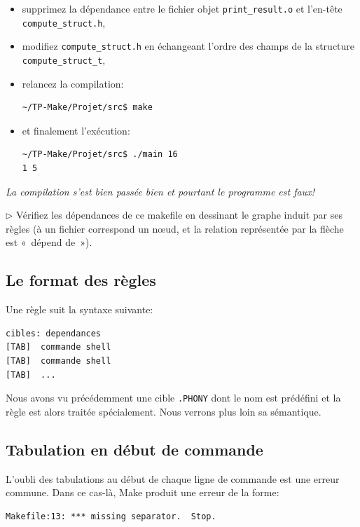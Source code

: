 \documentclass[11pt,a4paper]{article}
\newcommand{\must}{\noindent $\triangleright$ \xspace}
\begin{document}
\begin{itemize}

  \item[$\triangleright$] supprimez la dépendance entre le fichier
  objet \verb!print_result.o!  et l'en-tête \verb!compute_struct.h!,

  \item[$\triangleright$] modifiez \verb!compute_struct.h! en
  échangeant l'ordre des champs de la structure \verb!compute_struct_t!,

  \item[$\triangleright$] relancez la compilation:
{\small
\begin{verbatim}
~/TP-Make/Projet/src$ make
\end{verbatim}
}
   \item[$\triangleright$] et finalement l'exécution:
{\small
\begin{verbatim}
~/TP-Make/Projet/src$ ./main 16
1 5
\end{verbatim}
}

\end{itemize}

\noindent \emph{La compilation s'est bien passée bien et pourtant le
programme est faux!}

\medskip

\must Vérifiez les dépendances de ce makefile en dessinant le
graphe induit par ses règles (à un fichier correspond un n{\oe}ud, et
la relation représentée par la flèche est «~dépend de~»).

\subsection{Le format des règles}

\noindent Une règle suit la syntaxe suivante:
{\small
\begin{verbatim}
cibles: dependances
[TAB]  commande shell
[TAB]  commande shell
[TAB]  ...
\end{verbatim}
}

\noindent Nous avons vu précédemment une cible \texttt{.PHONY} dont
le nom est prédéfini et la règle est alors traitée spécialement. Nous
verrons plus loin sa sémantique.

\subsection{Tabulation en début de commande}

L'oubli des tabulations au début de chaque ligne de commande est une
erreur commune. Dans ce cas-là, \textsf{Make} produit une erreur de la
forme:
{\small
\begin{verbatim}
Makefile:13: *** missing separator.  Stop.
\end{verbatim}
}
\end{document}
